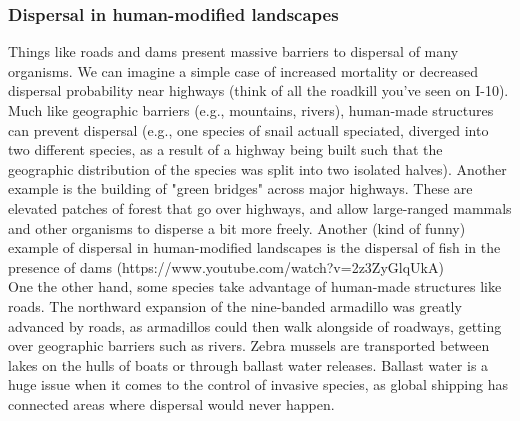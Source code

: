 \documentclass[12pt]{article}
\begin{document}
\subsubsection*{Dispersal in human-modified landscapes}

Things like roads and dams present massive barriers to dispersal of many organisms. We can imagine a simple case of increased mortality or decreased dispersal probability near highways (think of all the roadkill you've seen on I-10). Much like geographic barriers (e.g., mountains, rivers), human-made structures can prevent dispersal (e.g., one species of snail actuall speciated, diverged into two different species, as a result of a highway being built such that the geographic distribution of the species was split into two isolated halves). Another example is the building of "green bridges" across major highways. These are elevated patches of forest that go over highways, and allow large-ranged mammals and other organisms to disperse a bit more freely. Another (kind of funny) example of dispersal in human-modified landscapes is the dispersal of fish in the presence of dams (https://www.youtube.com/watch?v=2z3ZyGlqUkA) \\

One the other hand, some species take advantage of human-made structures like roads. The northward expansion of the nine-banded armadillo was greatly advanced by roads, as armadillos could then walk alongside of roadways, getting over geographic barriers such as rivers. Zebra mussels are transported between lakes on the hulls of boats or through ballast water releases. Ballast water is a huge issue when it comes to the control of invasive species, as global shipping has connected areas where dispersal would never happen. \\











\end{document}
